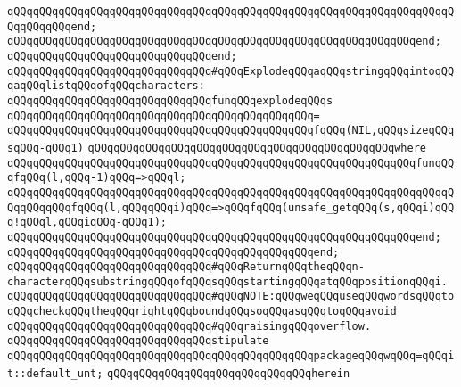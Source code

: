 \verb|qQQqqQQqqQQqqQQqqQQqqQQqqQQqqQQqqQQqqQQqqQQqqQQqqQQqqQQqqQQqqQQqqQQqqQQqqQQqqQQqend;|\newline
\verb|qQQqqQQqqQQqqQQqqQQqqQQqqQQqqQQqqQQqqQQqqQQqqQQqqQQqqQQqqQQqqQQqend;|\newline
\verb|qQQqqQQqqQQqqQQqqQQqqQQqqQQqqQQqend;|\newline
\newline
\newline
\newline
\verb|qQQqqQQqqQQqqQQqqQQqqQQqqQQqqQQq#qQQqExplodeqQQqaqQQqstringqQQqintoqQQqaqQQqlistqQQqofqQQqcharacters:|\newline
\newline
\verb|qQQqqQQqqQQqqQQqqQQqqQQqqQQqqQQqfunqQQqexplodeqQQqs|\newline
\verb|qQQqqQQqqQQqqQQqqQQqqQQqqQQqqQQqqQQqqQQqqQQqqQQq=|\newline
\verb|qQQqqQQqqQQqqQQqqQQqqQQqqQQqqQQqqQQqqQQqqQQqqQQqfqQQq(NIL,qQQqsizeqQQqsqQQq-qQQq1)|\newline
\verb|qQQqqQQqqQQqqQQqqQQqqQQqqQQqqQQqqQQqqQQqqQQqqQQqwhere|\newline
\verb|qQQqqQQqqQQqqQQqqQQqqQQqqQQqqQQqqQQqqQQqqQQqqQQqqQQqqQQqqQQqqQQqfunqQQqfqQQq(l,qQQq-1)qQQq=>qQQql;|\newline
\verb|qQQqqQQqqQQqqQQqqQQqqQQqqQQqqQQqqQQqqQQqqQQqqQQqqQQqqQQqqQQqqQQqqQQqqQQqqQQqqQQqfqQQq(l,qQQqqQQqi)qQQq=>qQQqfqQQq(unsafe_getqQQq(s,qQQqi)qQQq!qQQql,qQQqiqQQq-qQQq1);|\newline
\verb|qQQqqQQqqQQqqQQqqQQqqQQqqQQqqQQqqQQqqQQqqQQqqQQqqQQqqQQqqQQqqQQqend;|\newline
\verb|qQQqqQQqqQQqqQQqqQQqqQQqqQQqqQQqqQQqqQQqqQQqqQQqend;|\newline
\newline
\verb|qQQqqQQqqQQqqQQqqQQqqQQqqQQqqQQq#qQQqReturnqQQqtheqQQqn-characterqQQqsubstringqQQqofqQQqsqQQqstartingqQQqatqQQqpositionqQQqi.|\newline
\verb|qQQqqQQqqQQqqQQqqQQqqQQqqQQqqQQq#qQQqNOTE:qQQqweqQQquseqQQqwordsqQQqtoqQQqcheckqQQqtheqQQqrightqQQqboundqQQqsoqQQqasqQQqtoqQQqavoid|\newline
\verb|qQQqqQQqqQQqqQQqqQQqqQQqqQQqqQQq#qQQqraisingqQQqoverflow.|\newline
\newline
\verb|qQQqqQQqqQQqqQQqqQQqqQQqqQQqqQQqstipulate|\newline
\verb|qQQqqQQqqQQqqQQqqQQqqQQqqQQqqQQqqQQqqQQqqQQqqQQqpackageqQQqwqQQq=qQQqit::default_unt;|\newline
\verb|qQQqqQQqqQQqqQQqqQQqqQQqqQQqqQQqherein|\newline

